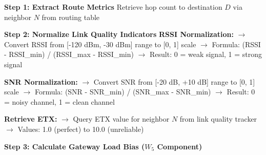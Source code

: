 \begin{algorithm}[H]
\caption{Multi-Metric Cost Calculation (Part 1: Metric Collection)}
\label{alg:cost-part1}
\SetAlgoLined
\DontPrintSemicolon

\textbf{Step 1: Extract Route Metrics}\;
\Indp
Retrieve hop count to destination $D$ via neighbor $N$ from routing table\;
\Indm

\textbf{Step 2: Normalize Link Quality Indicators}\;
\Indp
\textbf{RSSI Normalization:}\;
\Indp
$\rightarrow$ Convert RSSI from [-120 dBm, -30 dBm] range to [0, 1] scale\;
$\rightarrow$ Formula: (RSSI - RSSI\_min) / (RSSI\_max - RSSI\_min)\;
$\rightarrow$ Result: 0 = weak signal, 1 = strong signal\;
\Indm

\textbf{SNR Normalization:}\;
\Indp
$\rightarrow$ Convert SNR from [-20 dB, +10 dB] range to [0, 1] scale\;
$\rightarrow$ Formula: (SNR - SNR\_min) / (SNR\_max - SNR\_min)\;
$\rightarrow$ Result: 0 = noisy channel, 1 = clean channel\;
\Indm

\textbf{Retrieve ETX:}\;
\Indp
$\rightarrow$ Query ETX value for neighbor $N$ from link quality tracker\;
$\rightarrow$ Values: 1.0 (perfect) to 10.0 (unreliable)\;
\Indm
\Indm

\textbf{Step 3: Calculate Gateway Load Bias ($W_5$ Component)}\;
\Indp
{}
\Indm
\end{algorithm}

